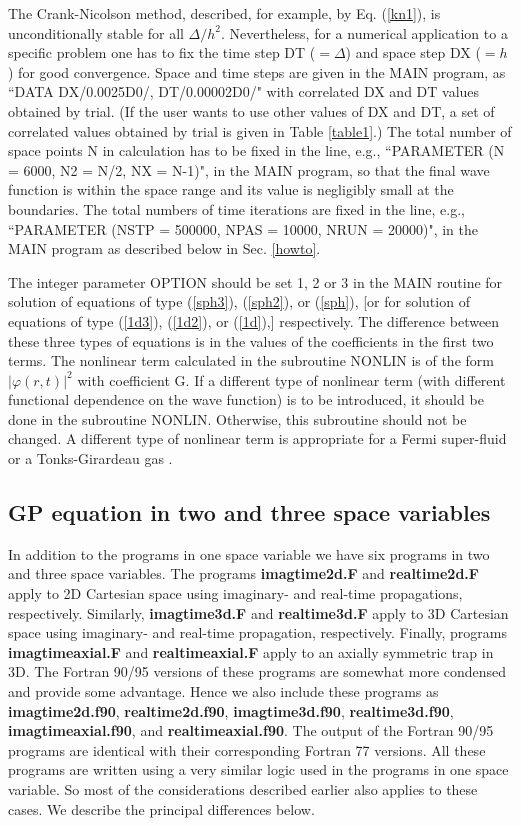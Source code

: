 \documentclass[onecolumn]{elsart3p}
\begin{document}
The Crank-Nicolson method, described, for example, by Eq. (\ref{kn1}), is
unconditionally stable for all $\Delta/h^2$. Nevertheless, for a numerical
application to a specific problem one has to fix the time step DT  ($=\Delta$) and
space step DX ($=h$) for good convergence. Space and time steps are given in the
MAIN program,   as ``DATA DX/0.0025D0/, DT/0.00002D0/" with correlated DX and DT
values obtained by trial. (If the user wants to use other values of DX and DT, a
set of correlated values obtained by trial is given in Table \ref{table1}.)  The
total number of space points N in calculation has to be fixed in the line,
e.g., ``PARAMETER (N = 6000, N2 = N/2, NX = N-1)",  in the MAIN program, so
that the final wave function is within the space range and its value is
negligibly small at the boundaries.  The total numbers of time iterations are
fixed in the line, e.g., ``PARAMETER (NSTP = 500000, NPAS = 10000, NRUN =
20000)", in the MAIN program as described below in Sec. \ref{howto}.


The integer parameter OPTION should be set 1, 2 or 3 in the MAIN routine for
solution of equations of type  (\ref{sph3}),  (\ref{sph2}), or (\ref{sph}), [or
for solution of equations of type (\ref{1d3}), (\ref{1d2}), or (\ref{1d}),]
respectively. The difference between these three types of equations is in the
values of the coefficients in the first two terms. The nonlinear term calculated
in the subroutine   NONLIN is of the form $|\varphi(r,t)|^2$ with coefficient G.
If a different type of nonlinear term (with different functional dependence on
the wave function) is to be introduced, it should be done in the subroutine
NONLIN. Otherwise, this subroutine should not be changed. A different type of
nonlinear term is appropriate for a Fermi super-fluid \cite{ska1,ska2} or a
Tonks-Girardeau gas \cite{tg}.

\subsection{GP equation in two and three space variables}


In addition to the programs in one space variable we have six programs in two
and three space variables. The programs {\bf imagtime2d.F} and {\bf
realtime2d.F} apply to 2D Cartesian space using imaginary- and real-time
propagations, respectively. Similarly, {\bf imagtime3d.F} and {\bf realtime3d.F}
apply to 3D Cartesian space using imaginary- and real-time propagation,
respectively. Finally, programs {\bf imagtimeaxial.F} and {\bf realtimeaxial.F}
apply to an axially symmetric trap in 3D. The Fortran 90/95 versions of these
programs are somewhat more condensed and provide some advantage. Hence we also
include these programs as {\bf imagtime2d.f90},  {\bf realtime2d.f90}, 
{\bf
imagtime3d.f90},  {\bf realtime3d.f90}, {\bf imagtimeaxial.f90}, and 
{\bf
realtimeaxial.f90}. The output of the Fortran 90/95 programs are 
identical with
their corresponding Fortran 77 versions. All these programs are written using a
very similar logic used in the programs in one space variable. So most of the
considerations described earlier also applies to these cases. We describe the
principal differences below.
\end{document}
